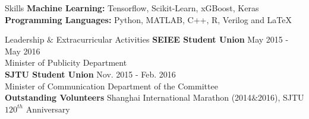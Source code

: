 \documentclass{resume} %
\begin{document}
\begin{rSection}{Skills}
{\bf Machine Learning: }
\hspace*{3.0 cm} Tensorflow, Scikit-Learn, xGBoost, Keras\\
{\bf Programming Languages: }
\hspace*{1.8 cm} Python, MATLAB, C++, R, Verilog and \LaTeX  \\
\end{rSection}
\begin{rSection}{Leadership $\&$ Extracurricular Activities}
\textbf{SEIEE Student Union} \hfill{May 2015 - May 2016}\\
Minister of Publicity Department  \\
\textbf{SJTU Student Union} \hfill{Nov. 2015 - Feb. 2016}\\
Minister of Communication Department of the Committee \\
\textbf{Outstanding Volunteers} \hfill{Shanghai International Marathon (2014$\&$2016), SJTU $120^{th}$ Anniversary}
\end{rSection}
\clearpage
\end{document}
